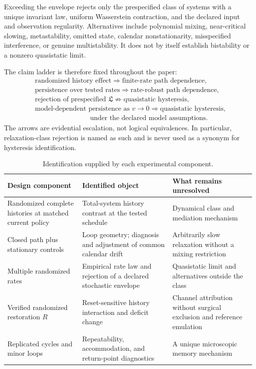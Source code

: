 \documentclass[pdflatex,sn-mathphys-num]{sn-jnl}
\begin{document}
Exceeding the envelope rejects only the prespecified class of systems with a unique invariant law, uniform Wasserstein contraction, and the declared input and observation regularity. Alternatives include polynomial mixing, near-critical slowing, metastability, omitted state, calendar nonstationarity, misspecified interference, or genuine multistability. It does not by itself establish bistability or a nonzero quasistatic limit.

The claim ladder is therefore fixed throughout the paper:
\begin{equation}
\begin{aligned}
&\text{randomized history effect}
  \Rightarrow \text{finite-rate path dependence},\\
&\text{persistence over tested rates}
  \Rightarrow \text{rate-robust path dependence},\\
&\text{rejection of prespecified }\mathfrak L
  \not\Rightarrow \text{quasistatic hysteresis},\\
&\text{model-dependent persistence as }v\to0
  \Rightarrow \text{quasistatic hysteresis},\\
&\hspace{8em}\text{under the declared model assumptions}.
\end{aligned}
\label{eq:claim-ladder}
\end{equation}
The arrows are evidential escalation, not logical equivalences. In particular, relaxation-class rejection is named as such and is never used as a synonym for hysteresis identification.

\begin{table}[!htbp]
\centering
\caption{Identification supplied by each experimental component.}
\label{tab:identification}
\small
\begin{tabularx}{\textwidth}{|p{3.2cm}|Y|Y|}
\hline
\textbf{Design component} & \textbf{Identified object} & \textbf{What remains unresolved}\\
\hline
Randomized complete histories at matched current policy & Total-system history contrast at the tested schedule & Dynamical class and mediation mechanism\\
\hline
Closed path plus stationary controls & Loop geometry; diagnosis and adjustment of common calendar drift & Arbitrarily slow relaxation without a mixing restriction\\
\hline
Multiple randomized rates & Empirical rate law and rejection of a declared stochastic envelope & Quasistatic limit and alternatives outside the class\\
\hline
Verified randomized restoration $R$ & Reset-sensitive history interaction and deficit change & Channel attribution without surgical exclusion and reference emulation\\
\hline
Replicated cycles and minor loops & Repeatability, accommodation, and return-point diagnostics & A unique microscopic memory mechanism\\
\hline
\end{tabularx}
\end{table}
\end{document}
